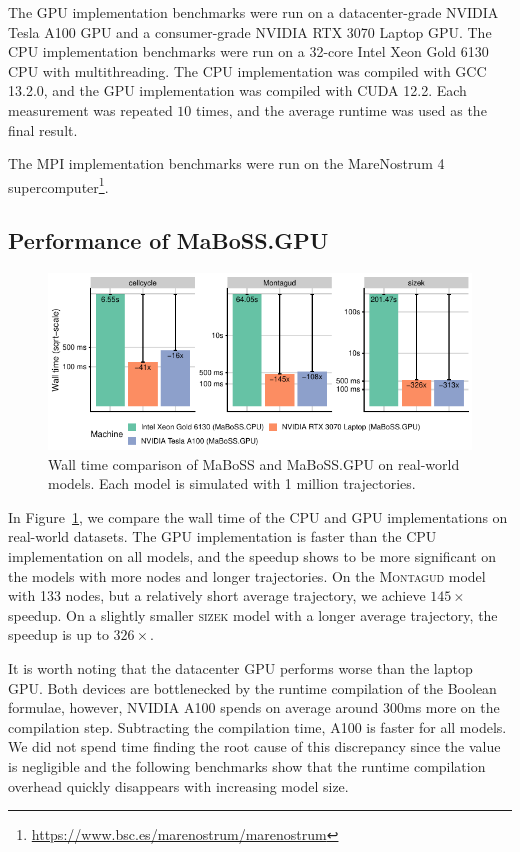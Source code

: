 \documentclass[sn-mathphys-num]{sn-jnl}%
\begin{document}
The GPU implementation benchmarks were run on a datacenter-grade NVIDIA Tesla A100 GPU and a consumer-grade NVIDIA RTX 3070 Laptop GPU. The CPU implementation benchmarks were run on a 32-core Intel Xeon Gold 6130 CPU with multithreading. The CPU implementation was compiled with GCC 13.2.0, and the GPU implementation was compiled with CUDA 12.2. Each measurement was repeated $10$ times, and the average runtime was used as the final result.

The MPI implementation benchmarks were run on the MareNostrum 4 supercomputer\footnote{\url{https://www.bsc.es/marenostrum/marenostrum}}.

\subsection{Performance of MaBoSS.GPU}

\begin{figure}
    \centering
    \includegraphics[width=\linewidth]{plots/real.pdf}
    \caption{Wall time comparison of MaBoSS and MaBoSS.GPU on real-world models. Each model is simulated with 1 million trajectories.}
    \label{fig:real}
\end{figure}

In Figure~\ref{fig:real}, we compare the wall time of the CPU and GPU implementations on real-world datasets. The GPU implementation is faster than the CPU implementation on all models, and the speedup shows to be more significant on the models with more nodes and longer trajectories. On the \textsc{Montagud} model with 133 nodes, but a relatively short average trajectory, we achieve $145\times$ speedup. On a slightly smaller \textsc{sizek} model with a longer average trajectory, the speedup is up to $326\times$. 

It is worth noting that the datacenter GPU performs worse than the laptop GPU. Both devices are bottlenecked by the runtime compilation of the Boolean formulae, however, NVIDIA A100 spends on average around $300$ms more on the compilation step. Subtracting the compilation time, A100 is faster for all models. We did not spend time finding the root cause of this discrepancy since the value is negligible and the following benchmarks show that the runtime compilation overhead quickly disappears with increasing model size.
\end{document}
